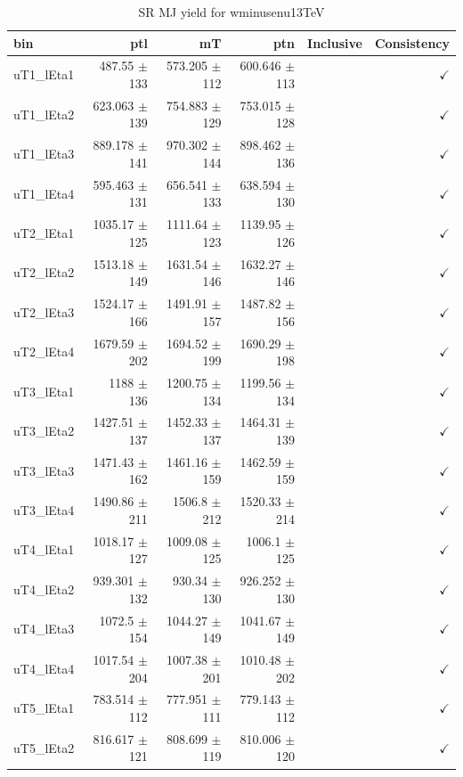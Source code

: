 \begin{table}[htbp]
\centering
\scriptsize
\caption{SR MJ yield for wminusenu13TeV}
\label{tab:wminusenu13TeV}
\setlength{\tabcolsep}{6pt}
\begin{tabular}{lrrrrr}
\hline
bin & ptl & mT & ptn & Inclusive & Consistency \\
\hline
uT1\_lEta1 & 487.55 $\pm$ 133 & 573.205 $\pm$ 112 & 600.646 $\pm$ 113 &  & $\checkmark$ \\
uT1\_lEta2 & 623.063 $\pm$ 139 & 754.883 $\pm$ 129 & 753.015 $\pm$ 128 &  & $\checkmark$ \\
uT1\_lEta3 & 889.178 $\pm$ 141 & 970.302 $\pm$ 144 & 898.462 $\pm$ 136 &  & $\checkmark$ \\
uT1\_lEta4 & 595.463 $\pm$ 131 & 656.541 $\pm$ 133 & 638.594 $\pm$ 130 &  & $\checkmark$ \\
uT2\_lEta1 & 1035.17 $\pm$ 125 & 1111.64 $\pm$ 123 & 1139.95 $\pm$ 126 &  & $\checkmark$ \\
uT2\_lEta2 & 1513.18 $\pm$ 149 & 1631.54 $\pm$ 146 & 1632.27 $\pm$ 146 &  & $\checkmark$ \\
uT2\_lEta3 & 1524.17 $\pm$ 166 & 1491.91 $\pm$ 157 & 1487.82 $\pm$ 156 &  & $\checkmark$ \\
uT2\_lEta4 & 1679.59 $\pm$ 202 & 1694.52 $\pm$ 199 & 1690.29 $\pm$ 198 &  & $\checkmark$ \\
uT3\_lEta1 & 1188 $\pm$ 136 & 1200.75 $\pm$ 134 & 1199.56 $\pm$ 134 &  & $\checkmark$ \\
uT3\_lEta2 & 1427.51 $\pm$ 137 & 1452.33 $\pm$ 137 & 1464.31 $\pm$ 139 &  & $\checkmark$ \\
uT3\_lEta3 & 1471.43 $\pm$ 162 & 1461.16 $\pm$ 159 & 1462.59 $\pm$ 159 &  & $\checkmark$ \\
uT3\_lEta4 & 1490.86 $\pm$ 211 & 1506.8 $\pm$ 212 & 1520.33 $\pm$ 214 &  & $\checkmark$ \\
uT4\_lEta1 & 1018.17 $\pm$ 127 & 1009.08 $\pm$ 125 & 1006.1 $\pm$ 125 &  & $\checkmark$ \\
uT4\_lEta2 & 939.301 $\pm$ 132 & 930.34 $\pm$ 130 & 926.252 $\pm$ 130 &  & $\checkmark$ \\
uT4\_lEta3 & 1072.5 $\pm$ 154 & 1044.27 $\pm$ 149 & 1041.67 $\pm$ 149 &  & $\checkmark$ \\
uT4\_lEta4 & 1017.54 $\pm$ 204 & 1007.38 $\pm$ 201 & 1010.48 $\pm$ 202 &  & $\checkmark$ \\
uT5\_lEta1 & 783.514 $\pm$ 112 & 777.951 $\pm$ 111 & 779.143 $\pm$ 112 &  & $\checkmark$ \\
uT5\_lEta2 & 816.617 $\pm$ 121 & 808.699 $\pm$ 119 & 810.006 $\pm$ 120 &  & $\checkmark$ \\

\end{tabular}
\end{table}
